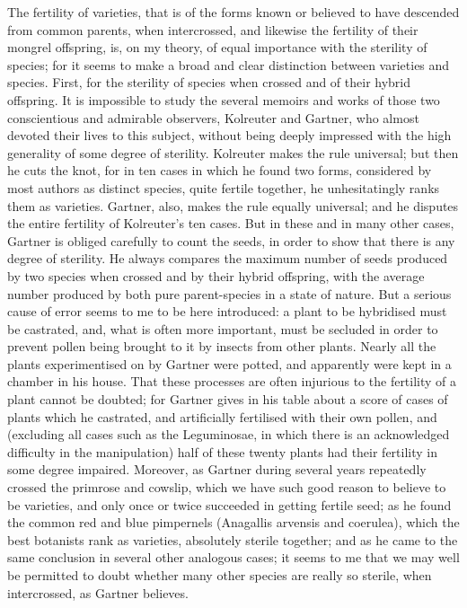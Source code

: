 The fertility of varieties, that is of the forms known or believed to have descended from common parents, when intercrossed, and likewise the fertility of their mongrel offspring, is, on my theory, of equal importance with the sterility of species; for it seems to make a broad and clear distinction between varieties and species.
First, for the sterility of species when crossed and of their hybrid offspring. It is impossible to study the several memoirs and works of those two conscientious and admirable observers, Kolreuter and Gartner, who almost devoted their lives to this subject, without being deeply impressed with the high generality of some degree of sterility. Kolreuter makes the rule universal; but then he cuts the knot, for in ten cases in which he found two forms, considered by most authors as distinct species, quite fertile together, he unhesitatingly ranks them as varieties. Gartner, also, makes the rule equally universal; and he disputes the entire fertility of Kolreuter's ten cases. But in these and in many other cases, Gartner is obliged carefully to count the seeds, in order to show that there is any degree of sterility. He always compares the maximum number of seeds produced by two species when crossed and by their hybrid offspring, with the average number produced by both pure parent-species in a state of nature. But a serious cause of error seems to me to be here introduced: a plant to be hybridised must be castrated, and, what is often more important, must be secluded in order to prevent pollen being brought to it by insects from other plants. Nearly all the plants experimentised on by Gartner were potted, and apparently were kept in a chamber in his house. That these processes are often injurious to the fertility of a plant cannot be doubted; for Gartner gives in his table about a score of cases of plants which he castrated, and artificially fertilised with their own pollen, and (excluding all cases such as the Leguminosae, in which there is an acknowledged difficulty in the manipulation) half of these twenty plants had their fertility in some degree impaired. Moreover, as Gartner during several years repeatedly crossed the primrose and cowslip, which we have such good reason to believe to be varieties, and only once or twice succeeded in getting fertile seed; as he found the common red and blue pimpernels (Anagallis arvensis and coerulea), which the best botanists rank as varieties, absolutely sterile together; and as he came to the same conclusion in several other analogous cases; it seems to me that we may well be permitted to doubt whether many other species are really so sterile, when intercrossed, as Gartner believes.
